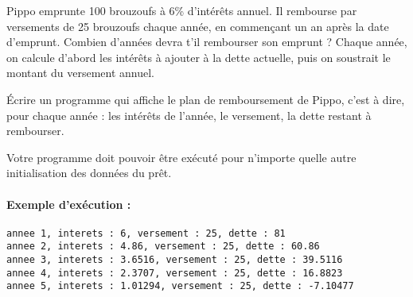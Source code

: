 Pippo emprunte 100 brouzoufs à 6\% d'intérêts annuel. Il rembourse
par versements de 25 brouzoufs chaque année, en commençant un an après
la date d'emprunt. Combien d'années devra t'il rembourser son emprunt
?  Chaque année, on calcule d'abord les intérêts à ajouter à la dette
actuelle, puis on soustrait le montant du versement annuel.

\question Écrire un programme qui affiche le plan de remboursement de
Pippo, c'est à dire, pour chaque année : les intérêts de l'année, le
versement, la dette restant à rembourser.

Votre programme doit pouvoir être exécuté pour n'importe quelle autre
initialisation des données du prêt.



\paragraph{Exemple d'exécution :}
\begin{small}
\begin{verbatim}
annee 1, interets : 6, versement : 25, dette : 81
annee 2, interets : 4.86, versement : 25, dette : 60.86
annee 3, interets : 3.6516, versement : 25, dette : 39.5116
annee 4, interets : 2.3707, versement : 25, dette : 16.8823
annee 5, interets : 1.01294, versement : 25, dette : -7.10477
\end{verbatim}
\end{small}


